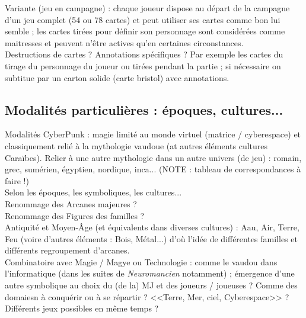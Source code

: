 \documentclass[11pt,twoside,a4paper]{article}
\begin{document}
Variante (jeu en campagne) : chaque joueur dispose au d{\'e}part de la campagne d'un jeu complet (54 ou 78 cartes) et peut utiliser ses cartes comme bon lui semble ; les cartes tir{\'e}es pour d{\'e}finir son personnage sont consid{\'e}r{\'e}es comme maitresses et peuvent n'{\^e}tre actives qu'en certaines circonstances.~\\

Destructions de cartes ? Annotations sp{\'e}cifiques ? Par exemple les cartes du tirage du personnage du joueur ou tir{\'e}es pendant la partie ; si n{\'e}cessaire on subtitue par un carton solide (carte bristol) avec annotations.~\\

\subsection{Modalit{\'e}s particuli{\`e}res : époques, cultures...}

Modalit{\'e}s CyberPunk : magie limit{\'e} au monde virtuel (matrice / cyberespace) et classiquement reli{\'e} {\`a} la mythologie vaudoue (at autres {\'e}l{\'e}ments cultures Cara{\"i}bes). 
Relier {\`a} une autre mythologie dans un autre univers (de jeu) : romain, grec, sum{\'e}rien, {\'e}gyptien, nordique, inca... (NOTE : tableau de correspondances {\`a} faire !)~\\

Selon les époques, les symboliques, les cultures...~\\

Renommage des Arcanes majeures ?~\\

Renommage des Figures des familles ?~\\

Antiquité et Moyen-Âge (et équivalents dans diverses cultures) : Aau, Air, Terre, Feu (voire d'autres éléments : Bois, Métal...) d'où l'idée de différentes familles et différents regroupement d'arcanes. ~\\

Combinatoire avec Magie / Magye ou Technologie : comme le vaudou dans l'informatique (dans les suites de \emph{Neuromancien} notamment) ; émergence d'une autre symbolique au choix du (de la) MJ et des joueurs / joueuses ? Comme des domaiesn à conquérir ou à se répartir ? <<Terre, Mer, ciel, Cyberespace>> ?~\\

Différents jeux possibles en même temps ?~\\
\end{document}
